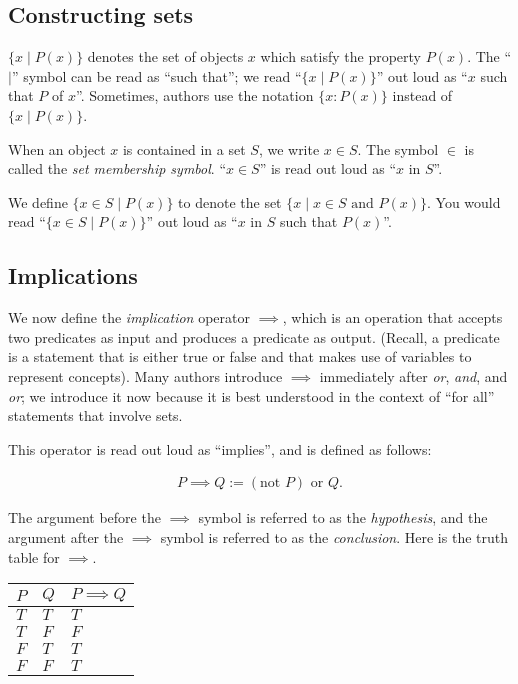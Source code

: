 \subsection*{Constructing sets}

$\{ x \mid P(x) \}$ denotes the set of objects $x$ which satisfy the property $P(x)$. The ``$\mid$'' symbol can be read as ``such that''; we read ``$\{ x \mid P(x) \}$'' out loud as ``$x$ such that $P$ of $x$''. Sometimes, authors use the notation $\{x : P(x) \}$ instead of $\{ x \mid P(x) \}$.

When an object $x$ is contained in a set $S$, we write $x \in S$. The symbol $\in$ is called the \textit{set membership symbol}. ``$x \in S$'' is read out loud as ``$x$ in $S$''.

We define $\{ x \in S \mid P(x)\}$ to denote the set $\{ x \mid x \in S \text{ and } P(x)\}$. You would read ``$\{ x \in S \mid P(x)\}$'' out loud as ``$x$ in $S$ such that $P(x)$''.

\subsection*{Implications}

We now define the \textit{implication} operator $\implies$, which is an operation that accepts two predicates as input and produces a predicate as output. (Recall, a predicate is a statement that is either true or false and that makes use of variables to represent concepts). Many authors introduce $\implies$ immediately after \textit{or}, \textit{and}, and \textit{or}; we introduce it now because it is best understood in the context of ``for all'' statements that involve sets.

This operator is read out loud as ``implies'', and is defined as follows:

\begin{align*}
    P \implies Q := (\text{not } P) \text{ or } Q.
\end{align*}

The argument before the $\implies$ symbol is referred to as the \textit{hypothesis}, and the argument after the $\implies$ symbol is referred to as the \textit{conclusion}. Here is the truth table for $\implies$.

\begin{table}[H]
    \centering
    \begin{tabular}{|l|l|l|}
    \hline
    $P$ & $Q$ & $P \implies Q$ \\ \hline
    $T$ & $T$ & $T$        \\ \hline
    $T$ & $F$ & $F$        \\ \hline
    $F$ & $T$ & $T$        \\ \hline
    $F$ & $F$ & $T$        \\ \hline
    \end{tabular}
\end{table}


